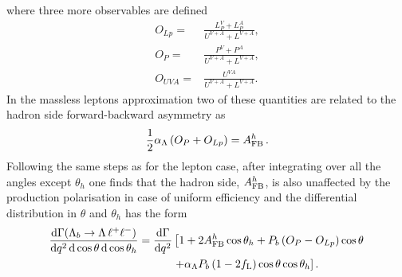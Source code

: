 where three more observables are defined
\begin{align}
O_{Lp}=&\frac{L_P^{V}+L_P^{A}}{U^{V+A}+L^{V+A}}, \nonumber \\
O_P=&\frac{P^{V}+P^{A}}{U^{V+A}+L^{V+A}}, \nonumber \\
O_{UVA}=&\frac{U^{VA}}{U^{V+A}+L^{V+A}}. \nonumber
\end{align}
%
In the massless leptons approximation two of these quantities are related to the hadron side
forward-backward asymmetry as
\begin{equation}
\frac{1}{2}\alpha_\Lambda \left(O_P+O_{Lp}\right)=A_{\rm FB}^h\,.
\end{equation}
%
Following the same steps as for the lepton case, after integrating over all the angles except $\theta_h$ one finds
that the hadron side, $A_{\rm FB}^h$, is also unaffected by the production polarisation in case of uniform
efficiency and the differential distribution in $\theta$ and $\theta_h$ has the form
\begin{align}
\frac{\mathrm{d}\Gamma(\Lambda_{b}\rightarrow \Lambda \,\ell^{+}\ell^{-})}{\mathrm{d}q^2\,\mathrm{d}\cos\theta\,\mathrm{d}\cos\theta_h}=
\frac{\mathrm{d}\Gamma}{\mathrm{d}q^2}&\left[1+2A_{\rm FB}^h\cos\theta_h+P_b\left(O_P-O_{Lp}\right)\cos\theta\right.\nonumber \\
&\left.+\alpha_\Lambda P_b\left(1-2f_{\rm L}\right)\cos\theta\cos\theta_h\right].
\label{eq:hadron2D}
\end{align}

